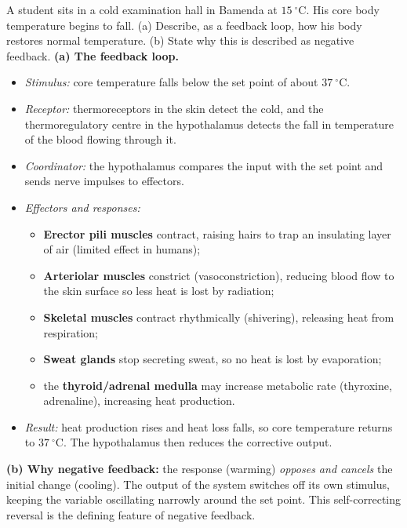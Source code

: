 \documentclass[11pt]{article}
\newcommand{\cle}[1]{{\popxbold\color{popdark}#1}}
\begin{document}
\begin{exoresolu}
A student sits in a cold examination hall in Bamenda at $15\ ^\circ\mathrm{C}$. His core body temperature begins to fall. (a) Describe, as a feedback loop, how his body restores normal temperature. (b) State why this is described as negative feedback.
\tcblower
\textbf{(a) The feedback loop.}
\begin{itemize}
\item \emph{Stimulus:} core temperature falls below the set point of about $37\ ^\circ\mathrm{C}$.
\item \emph{Receptor:} thermoreceptors in the skin detect the cold, and the \cle{thermoregulatory centre in the hypothalamus} detects the fall in temperature of the blood flowing through it.
\item \emph{Coordinator:} the hypothalamus compares the input with the set point and sends nerve impulses to effectors.
\item \emph{Effectors and responses:}
\begin{itemize}
\item \textbf{Erector pili muscles} contract, raising hairs to trap an insulating layer of air (limited effect in humans);
\item \textbf{Arteriolar muscles} constrict (\cle{vasoconstriction}), reducing blood flow to the skin surface so less heat is lost by radiation;
\item \textbf{Skeletal muscles} contract rhythmically (\cle{shivering}), releasing heat from respiration;
\item \textbf{Sweat glands} stop secreting sweat, so no heat is lost by evaporation;
\item the \textbf{thyroid/adrenal medulla} may increase metabolic rate (thyroxine, adrenaline), increasing heat production.
\end{itemize}
\item \emph{Result:} heat production rises and heat loss falls, so core temperature returns to $37\ ^\circ\mathrm{C}$. The hypothalamus then reduces the corrective output.
\end{itemize}
\textbf{(b) Why negative feedback:} the response (warming) \emph{opposes and cancels} the initial change (cooling). The output of the system switches off its own stimulus, keeping the variable oscillating narrowly around the set point. This self-correcting reversal is the defining feature of negative feedback.
\end{exoresolu}
\end{document}
